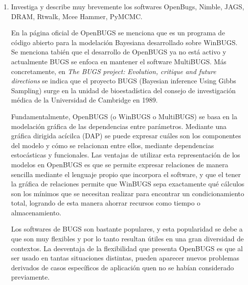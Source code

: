 \documentclass{article}
\begin{document}
\begin{enumerate}
\begin{verbatim}
Y = array([1275, 325, 517, 0, 86, 0, 101, 0, 0, 89, 78, 83, 0, 1074, 508, 5, 0, 0, 0, 1447, 0, 0, 
0, 0, 0, 0, 0, 87, 7, 37, 0, 15, 5, 6, 35, 0, 158, 0, 0, 1349, 0, 35, 0, 0, 12, 0, 0, 2, 0, 1117, 0, 
79, 0, 13, 0, 0, 0, 1334, 56, 0, 81, 0, 0, 1480, 177, 0, 29, 0, 0, 551, 0, 1338, 196, 0, 9, 104, 0, 
0, 3, 1430, 0, 2, 492, 0, 0, 0, 0, 0, 0, 0, 0, 1057, 0, 0, 0, 68, 0, 87, 1362, 0]) \end{verbatim}


    \begin{proof}[Solución]
        
    \end{proof}

    \item Investiga y describe muy brevemente los softwares OpenBugs, Nimble, 
    JAGS, DRAM, Rtwalk, Mcee Hammer, PyMCMC.

    En la página oficial de OpenBUGS se menciona que es un programa de código 
    abierto para la modelación Bayesiana desarrollado sobre WinBUGS. Se menciona
    tabién que el desarrollo de OpenBUGS ya no está activo y actualmente BUGS se
    enfoca en mantener el software MultiBUGS. Más concretamente, en 
    \textit{The BUGS project: Evolution, critique and future directions} se indica 
    que el proyecto BUGS (Bayesian inference Using Gibbs Sampling) surge en la 
    unidad de bioestadística del consejo de investigación médica de la Universidad
    de Cambridge en 1989.  
    
    Fundamentalmente, OpenBUGS (o WinBUGS o MultiBUGS) se basa en la modelación 
    gráfica de las dependencias entre parámetros. Mediante una gráfica dirigida
    acícilca (DAP) se puede expresar cuáles son los componentes del modelo y cómo
    se relacionan entre ellos, mediante dependencias estocásticas y funcionales.
    Las ventajas de utilizar esta representación de los modelos en OpenBUGS es que
    se permite expresar relaciones de manera sencilla mediante el lenguaje propio que
    incorpora el software, y que el tener la gráfica de relaciones permite que
    WinBUGS sepa exactamente qué cálculos son los mínimos que se necesitan realizar
    para encontrar un condicionamiento total, logrando de esta manera ahorrar recursos
    como tiempo o almacenamiento.

    Los softwares de BUGS son bastante populares, y esta popularidad se debe a que
    son muy flexibles y por lo tanto resultan útiles en una gran diversidad de 
    contextos. La desventaja de la flexibilidad que presenta OpenBUGS es que al
    ser usado en tantas situaciones distintas, pueden aparecer nuevos problemas
    derivados de casos específicos de aplicación quen no se habían considerado
    previamente.


\end{enumerate}
\end{document}
